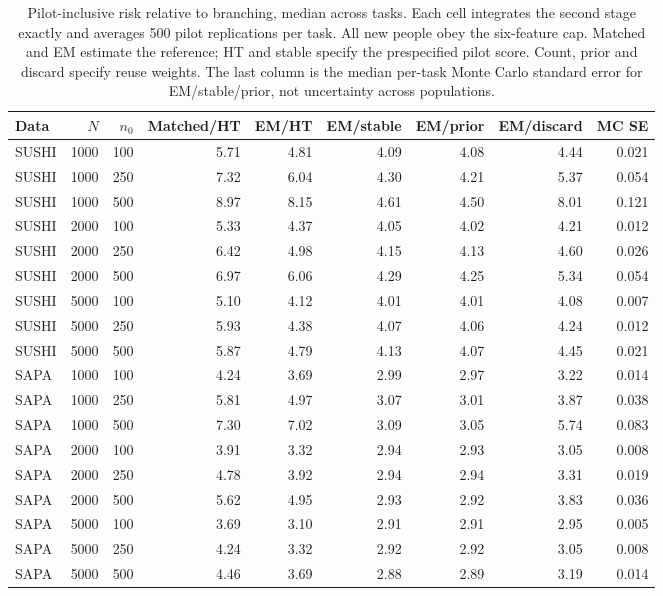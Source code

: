 \begin{table}[t]
\centering
\caption{Pilot-inclusive risk relative to branching, median across tasks. Each cell integrates the second stage exactly and averages 500 pilot replications per task. All new people obey the six-feature cap. Matched and EM estimate the reference; HT and stable specify the prespecified pilot score. Count, prior and discard specify reuse weights. The last column is the median per-task Monte Carlo standard error for EM/stable/prior, not uncertainty across populations.}
\label{tab:em}
\small
\setlength{\tabcolsep}{4pt}
\begin{tabular}{lrrrrrrrr}
\toprule
Data & $N$ & $n_0$ & Matched/HT & EM/HT & EM/stable & EM/prior & EM/discard & MC SE \\
\midrule
SUSHI & 1000 & 100 & 5.71 & 4.81 & 4.09 & 4.08 & 4.44 & 0.021 \\
SUSHI & 1000 & 250 & 7.32 & 6.04 & 4.30 & 4.21 & 5.37 & 0.054 \\
SUSHI & 1000 & 500 & 8.97 & 8.15 & 4.61 & 4.50 & 8.01 & 0.121 \\
SUSHI & 2000 & 100 & 5.33 & 4.37 & 4.05 & 4.02 & 4.21 & 0.012 \\
SUSHI & 2000 & 250 & 6.42 & 4.98 & 4.15 & 4.13 & 4.60 & 0.026 \\
SUSHI & 2000 & 500 & 6.97 & 6.06 & 4.29 & 4.25 & 5.34 & 0.054 \\
SUSHI & 5000 & 100 & 5.10 & 4.12 & 4.01 & 4.01 & 4.08 & 0.007 \\
SUSHI & 5000 & 250 & 5.93 & 4.38 & 4.07 & 4.06 & 4.24 & 0.012 \\
SUSHI & 5000 & 500 & 5.87 & 4.79 & 4.13 & 4.07 & 4.45 & 0.021 \\
SAPA & 1000 & 100 & 4.24 & 3.69 & 2.99 & 2.97 & 3.22 & 0.014 \\
SAPA & 1000 & 250 & 5.81 & 4.97 & 3.07 & 3.01 & 3.87 & 0.038 \\
SAPA & 1000 & 500 & 7.30 & 7.02 & 3.09 & 3.05 & 5.74 & 0.083 \\
SAPA & 2000 & 100 & 3.91 & 3.32 & 2.94 & 2.93 & 3.05 & 0.008 \\
SAPA & 2000 & 250 & 4.78 & 3.92 & 2.94 & 2.94 & 3.31 & 0.019 \\
SAPA & 2000 & 500 & 5.62 & 4.95 & 2.93 & 2.92 & 3.83 & 0.036 \\
SAPA & 5000 & 100 & 3.69 & 3.10 & 2.91 & 2.91 & 2.95 & 0.005 \\
SAPA & 5000 & 250 & 4.24 & 3.32 & 2.92 & 2.92 & 3.05 & 0.008 \\
SAPA & 5000 & 500 & 4.46 & 3.69 & 2.88 & 2.89 & 3.19 & 0.014 \\
\bottomrule
\end{tabular}
\end{table}
